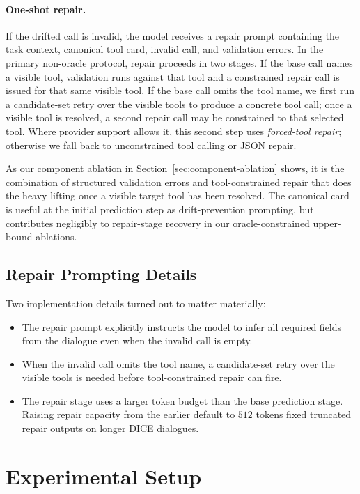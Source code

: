 \documentclass[runningheads]{llncs}
\begin{document}
\paragraph{One-shot repair.}
If the drifted call is invalid, the model receives a repair prompt containing the
task context, canonical tool card, invalid call, and validation errors. In the
primary non-oracle protocol, repair proceeds in two stages. If the base call names
a visible tool, validation runs against that tool and a constrained repair call is
issued for that same visible tool. If the base call omits the tool name, we first
run a candidate-set retry over the visible tools to produce a concrete tool call;
once a visible tool is resolved, a second repair call may be constrained to that
selected tool. Where provider support allows it, this second step uses
\emph{forced-tool repair}; otherwise we fall back to unconstrained tool calling or
JSON repair.

As our component ablation in Section~\ref{sec:component-ablation} shows, it is the
combination of structured validation errors and tool-constrained repair that does
the heavy lifting once a visible target tool has been resolved. The canonical card
is useful at the initial prediction step as drift-prevention prompting, but
contributes negligibly to repair-stage recovery in our oracle-constrained
upper-bound ablations.

\subsection{Repair Prompting Details}
Two implementation details turned out to matter materially:
\begin{itemize}
\item The repair prompt explicitly instructs the model to infer all required fields
from the dialogue even when the invalid call is empty.
\item When the invalid call omits the tool name, a candidate-set retry over the
visible tools is needed before tool-constrained repair can fire.
\item The repair stage uses a larger token budget than the base prediction stage.
Raising repair capacity from the earlier default to $512$ tokens fixed truncated
repair outputs on longer DICE dialogues.
\end{itemize}

\section{Experimental Setup}
\end{document}

